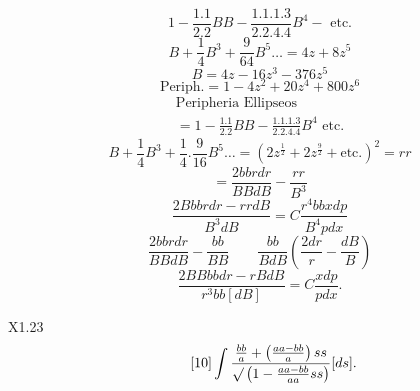 \begingroup
\setlength{\headheight}{25pt}
\makeatletter\tagsleft@true\let\veqno\@@leqno\makeatother
{}\NoSourceHead
{}
\noindent [S. 25]
\begin{equation}\tag*{[1]}1-\frac{1.1}{2.2}BB-\frac{1.1.1.3}{2.2.4.4}B^4-\text{ etc.}\end{equation}
\begin{equation}\tag*{[2]}B+\frac14B^3+\frac9{64}B^5\ldots=4z+8z^5\end{equation}
\begin{equation}\tag*{[3]}B=4z-16z^3-376z^5\end{equation}
\begin{equation}\tag*{[4]}\text{Periph.}=1-4z^2+20z^4+800z^6\end{equation}
\ClosingRule
\noindent [S. 26]
\begin{equation}\tag*{[5]}\begin{gathered}
\text{Peripheria Ellipseos}\\
=1-\frac{1.1}{2.2}BB-\frac{1.1.1.3}{2.2.4.4}B^4\text{ etc.}
\end{gathered}\end{equation}
\begin{equation}\tag*{[6]}B+\frac14B^3+\frac14.\frac9{16}B^5\ldots=(2z^{\frac12}+2z^{\frac92}+\text{etc.})^2=rr\end{equation}
\begin{equation}\tag*{[7]}=\frac{2bbrdr}{BBdB}-\frac{rr}{B^3}\end{equation}
\begin{equation}\tag*{[8]}\frac{2Bbbrdr-rrdB}{B^3dB}=C\frac{r^4bbxdp}{B^4pdx}\end{equation}
\[\frac{2bbrdr}{BBdB}-\frac{bb}{BB}\qquad\frac{bb}{BdB}\left(\frac{2dr}{r}-\frac{dB}{B}\right)\]
\begin{equation}\tag*{[9]}\frac{2BBbbdr-rBdB}{r^3bb[dB]}=C\frac{xdp}{pdx}.\end{equation}
\par\vfill\noindent X1.\hfill23
\clearpage
{}
\noindent [S. 37]
\begin{equation}\tag*{[10]}\int\frac{\frac{bb}{a}+\left(\frac{aa-bb}{a}\right)ss}{\surd\left(1-\frac{aa-bb}{aa}ss\right)}[ds].\end{equation}
